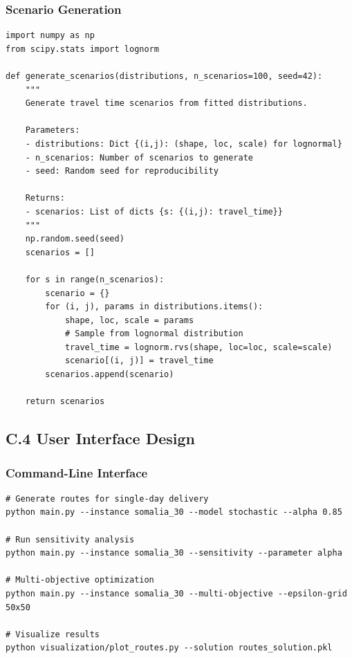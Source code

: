 \subsubsection{Scenario Generation}

\begin{verbatim}
import numpy as np
from scipy.stats import lognorm

def generate_scenarios(distributions, n_scenarios=100, seed=42):
    """
    Generate travel time scenarios from fitted distributions.

    Parameters:
    - distributions: Dict {(i,j): (shape, loc, scale) for lognormal}
    - n_scenarios: Number of scenarios to generate
    - seed: Random seed for reproducibility

    Returns:
    - scenarios: List of dicts {s: {(i,j): travel_time}}
    """
    np.random.seed(seed)
    scenarios = []

    for s in range(n_scenarios):
        scenario = {}
        for (i, j), params in distributions.items():
            shape, loc, scale = params
            # Sample from lognormal distribution
            travel_time = lognorm.rvs(shape, loc=loc, scale=scale)
            scenario[(i, j)] = travel_time
        scenarios.append(scenario)

    return scenarios
\end{verbatim}

\subsection{C.4 User Interface Design}

\subsubsection{Command-Line Interface}

\begin{verbatim}
# Generate routes for single-day delivery
python main.py --instance somalia_30 --model stochastic --alpha 0.85

# Run sensitivity analysis
python main.py --instance somalia_30 --sensitivity --parameter alpha

# Multi-objective optimization
python main.py --instance somalia_30 --multi-objective --epsilon-grid 50x50

# Visualize results
python visualization/plot_routes.py --solution routes_solution.pkl
\end{verbatim}

